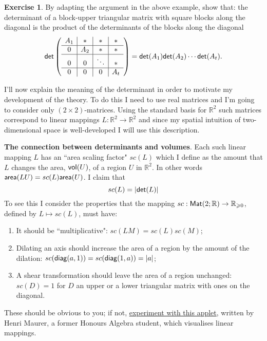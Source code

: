 \documentclass[11pt]{amsbook}
\theoremstyle{definition}
\newtheorem{exercise}{Exercise}
\begin{document}
\begin{exercise} \label{blockdet}
By adapting the argument in the above example, show that: the determinant of a block-upper triangular matrix with square blocks along the diagonal is the product of the determinants of the blocks along the diagonal
$$ {\sf det} \left(
\begin{array}{c | c | c | c}
A_1 & \ast & \ast & \ast \\ \hline
0 & A_2 & \ast & \ast \\ \hline 0 & 0 & \ddots & \ast \\ \hline 0 & 0 & 0 & A_t
\end{array}\right) = {\sf det}(A_1) {\sf det}(A_2) \cdots {\sf det}(A_t).
$$
\end{exercise}
\medskip

I'll now explain the meaning of the determinant in order to motivate my development of the theory. To do this I need to use real matrices and I'm going to consider only $(2\times 2)$-matrices. Using the standard basis for $\mathbb{R}^2$ such matrices correspond to linear mappings $L:\mathbb{R}^2 \to \mathbb{R}^2$ and since my spatial intuition of two-dimensional space is well-developed I will use this description.
\medskip

\noindent
{\bf The connection between determinants and volumes}. Each such linear mapping $L$ has an ``area scaling factor" $sc(L)$ which I define as the amount that $L$ changes the area, ${\sf vol}(U)$, of a region $U$ in $\mathbb{R}^2$. In other words ${\sf area}(LU) = sc(L) {\sf area}(U)$. I claim that $$sc(L) = | {\sf det}(L) |$$ To see this I consider the properties that the mapping $sc: {\sf Mat}(2; \mathbb{R}) \to \mathbb{R}_{\geqslant 0}$, defined by $L\mapsto sc(L)$, must have:
\begin{enumerate}
\item
It should be ``multiplicative": $sc(LM) = sc(L)sc(M)$;
\item
Dilating an axis should increase the area of a region by the amount of the dilation: $sc({\sf diag}(a,1)) = sc({\sf diag}(1,a)) = |a|$;
\item
A shear transformation should leave the area of a region unchanged: $sc(D) = 1$ for $D$ an upper or a lower triangular matrix with ones on the diagonal.
\end{enumerate}
These should be obvious to you; if not, \href{http://halg.s3-website-eu-west-1.amazonaws.com}{experiment with this applet}, written by Henri Maurer, a former Honours Algebra student, which visualises linear mappings.
\end{document}

